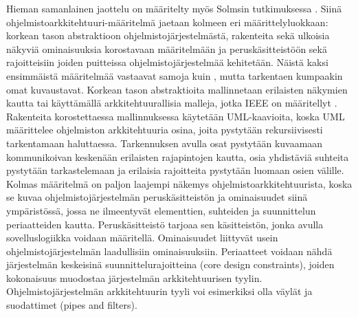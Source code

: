 \documentclass[finnish]{tktltiki2}
\theoremstyle{definition}
\theoremstyle{remark}
\begin{document}
Hieman samanlainen jaottelu on määritelty myös Solmsin tutkimuksessa \citep[s. 369]{solms_what_2012}. Siinä ohjelmistoarkkitehtuuri-määritelmä jaetaan kolmeen eri määrittelyluokkaan: korkean tason abstraktioon ohjelmistojärjestelmästä, rakenteita sekä ulkoisia näkyviä ominaisuuksia korostavaan määritelmään ja peruskäsitteistöön sekä rajoitteisiin joiden puitteissa ohjelmistojärjestelmää kehitetään. Näistä kaksi ensimmäistä määritelmää vastaavat samoja kuin \citep[s. 2-7]{gorton_understanding_2011}, mutta tarkentaen kumpaakin omat kuvaustavat. Korkean tason abstraktioita mallinnetaan erilaisten näkymien kautta tai käyttämällä arkkitehtuurallisia malleja, jotka IEEE on määritellyt \cite{ieee_2000}. %
Rakenteita korostettaessa mallinnuksessa käytetään UML-kaavioita, koska UML määrittelee ohjelmiston arkkitehtuuria osina, joita pystytään rekursiivisesti tarkentamaan haluttaessa. Tarkennuksen avulla osat pystytään kuvaamaan kommunikoivan keskenään erilaisten rajapintojen kautta, osia yhdistäviä suhteita pystytään tarkastelemaan ja erilaisia rajoitteita pystytään luomaan osien välille. Kolmas määritelmä on paljon laajempi näkemys ohjelmistoarkkitehtuurista, koska se kuvaa ohjelmistojärjestelmän peruskäsitteistön ja ominaisuudet siinä ympäristössä, jossa ne ilmeentyvät elementtien, suhteiden ja suunnittelun periaatteiden kautta. Peruskäsitteistö tarjoaa sen käsitteistön, jonka avulla sovelluslogiikka voidaan määritellä. Ominaisuudet liittyvät usein ohjelmistojärjestelmän laadullisiin ominaisuuksiin. Periaatteet voidaan nähdä järjestelmän keskeisinä suunnittelurajoitteina (core design constraints), joiden kokonaisuus muodostaa järjestelmän arkkitehtuurisen tyylin. Ohjelmistojärjestelmän arkkitehtuurin tyyli voi esimerkiksi olla väylät ja suodattimet (pipes and filters). %
\end{document}
